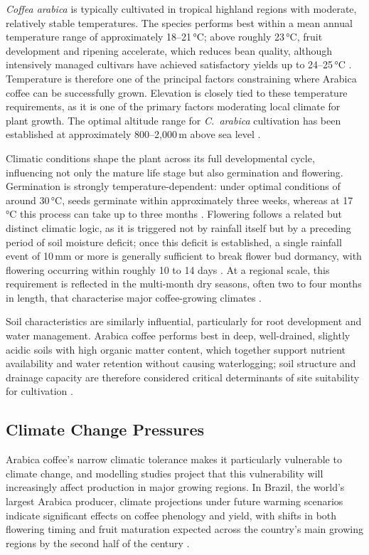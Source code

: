 \documentclass[12pt,a4paper]{article}
\begin{document}
\textit{Coffea arabica} is typically cultivated in tropical highland regions with moderate, relatively stable temperatures. The species performs best within a mean annual temperature range of approximately 18--21\,°C; above roughly 23\,°C, fruit development and ripening accelerate, which reduces bean quality, although intensively managed cultivars have achieved satisfactory yields up to 24--25\,°C \citep{DaMatta2006}. Temperature is therefore one of the principal factors constraining where Arabica coffee can be successfully grown. Elevation is closely tied to these temperature requirements, as it is one of the primary factors moderating local climate for plant growth. The optimal altitude range for \textit{C.~arabica} cultivation has been established at approximately 800--2{,}000\,m above sea level \citep{Liu2025}.

Climatic conditions shape the plant across its full developmental cycle, influencing not only the mature life stage but also germination and flowering. Germination is strongly temperature-dependent: under optimal conditions of around 30\,°C, seeds germinate within approximately three weeks, whereas at 17\,°C this process can take up to three months \citep{Tummakate1991}. Flowering follows a related but distinct climatic logic, as it is triggered not by rainfall itself but by a preceding period of soil moisture deficit; once this deficit is established, a single rainfall event of 10\,mm or more is generally sufficient to break flower bud dormancy, with flowering occurring within roughly 10 to 14 days \citep{RendonSaenz2025}. At a regional scale, this requirement is reflected in the multi-month dry seasons, often two to four months in length, that characterise major coffee-growing climates \citep{RendonSaenz2025}.

Soil characteristics are similarly influential, particularly for root development and water management. Arabica coffee performs best in deep, well-drained, slightly acidic soils with high organic matter content, which together support nutrient availability and water retention without causing waterlogging; soil structure and drainage capacity are therefore considered critical determinants of site suitability for cultivation \citep{DaMatta2006}.

\subsection{Climate Change Pressures}

Arabica coffee's narrow climatic tolerance makes it particularly vulnerable to climate change, and modelling studies project that this vulnerability will increasingly affect production in major growing regions. In Brazil, the world's largest Arabica producer, climate projections under future warming scenarios indicate significant effects on coffee phenology and yield, with shifts in both flowering timing and fruit maturation expected across the country's main growing regions by the second half of the century \citep{deFreitas2024}.
\end{document}

